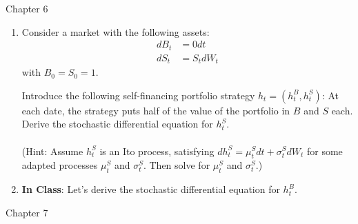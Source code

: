 \documentclass[12pt]{article}
\newcommand{\s}{\sigma}
\begin{document}
Chapter 6

\begin{enumerate}
  \item Consider a market with the following assets:
\begin{align*}
dB_t		& = 0 dt\\
dS_t		& = S_t dW_t
\end{align*}
with $B_0 = S_0 = 1$.

Introduce the following self-financing portfolio strategy $h_t = (h^B_t, h^S_t)$: At each date, the strategy puts half of the value of the portfolio in $B$ and $S$ each. Derive the stochastic differential equation for $h^S_t$.
\\
\\
(Hint: Assume $h^S_t$ is an Ito process, satisfying $dh^S_t = \mu^S_t dt + \s^S_t dW_t$ for some adapted processes $\mu^S_t$ and $\s^S_t$. Then solve for $\mu^S_t$ and $\s^S_t$.)

\item[] \textbf{In Class}: Let's derive the stochastic differential equation for $h^B_t$.

\end{enumerate}

Chapter 7
\end{document}
